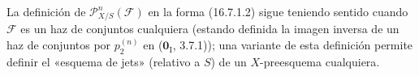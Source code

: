 \begin{remark}[16.7.10]
\label{IV.16.7.10}
La definición de $\mathscr{P}_{X/S}^n(\mathscr{F})$ en la forma (16.7.1.2)
sigue teniendo sentido cuando $\mathscr{F}$ es un haz de conjuntos cualquiera
(estando definida la imagen inversa de un haz de conjuntos por $p_2^{(n)}$ en ($\mathbf{0}_{\mathrm I}$, 3.7.1)); una variante de esta definición permite
definir el «esquema de jets» (relativo a $S$) de un $X$-preesquema
cualquiera.
\end{remark}
